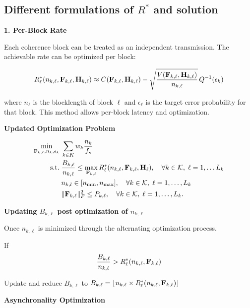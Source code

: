 \documentclass[a4paper, 12pt, onecolumn, journal, twoside, draftclsnofoot]{IEEEtran}
\begin{document}
\subsection{Different formulations of $R^*$ and solution}

\textbf{1. Per-Block Rate}

Each coherence block can be treated as an independent transmission. The achievable rate can be optimized per block:

\begin{equation*}
	R^*_\ell(n_{k,\ell}, {\bf F}_{k,\ell}, {\bf H}_{k,\ell}) \approx C({\bf F}_{k,\ell}, {\bf H}_{k,\ell}) - \sqrt{\frac{V({\bf F}_{k,\ell}, {\bf H}_{k,\ell})}{n_{k,\ell}} } \, Q^{-1}(\epsilon_k)
\end{equation*}

where $n_\ell$ is the blocklength of block $\ell$ and $\epsilon_\ell$ is the target error probability for that block. This method allows per-block latency and optimization.

\textbf{Updated Optimization Problem} 

\begin{equation*}
	\begin{split}
		\min_{{\bf F}_{k,\ell}, n_{k}, \epsilon_k} \;& \sum_{k \in K} w_k \frac{n_k}{f_s} \\
		\text{s.t.}\;& \frac{B_{k,\ell}}{n_{k,\ell}} \leq \max_{{\bf F}_{k, \ell}} R^*_\ell(n_{k,\ell}, {\bf F}_{k, \ell},  {\bf H}_\ell), \quad \forall k \in { \mathcal{K} }, \; \ell = 1, \ldots L_k \\ 
		& n_{k,l} \in [n_{\text{min}}, n_{\text{max}}], \quad \forall k \in { \mathcal{K} }, \; \ell = 1, \ldots, L_k \\
		& \|{\bf F}_{k,\ell}\|_F^2 \leq P_{k,\ell}, \quad \forall k \in { \mathcal{K} }, \; \ell = 1, \ldots, L_k.
	\end{split}
\end{equation*}


\textbf{Updating $B_{k, \ell}$ post optimization of $n_{k,\ell}$}

Once $n_{k, \ell}$ is minimized through the alternating optimization process.

If 
\begin{equation*}
	\frac{B_{k,\ell}}{n_{k,\ell}} > R^*_\ell(n_{k,\ell}, {\bf F}_{k, \ell})
\end{equation*}

Update and reduce $B_{k, \ell}$ to $B_{k, \ell} =  \lfloor n_{k, \ell} \times R^*_\ell(n_{k,\ell}, {\bf F}_{k, \ell}) \rfloor$

\textbf{Asynchronality Optimization}
\end{document}
